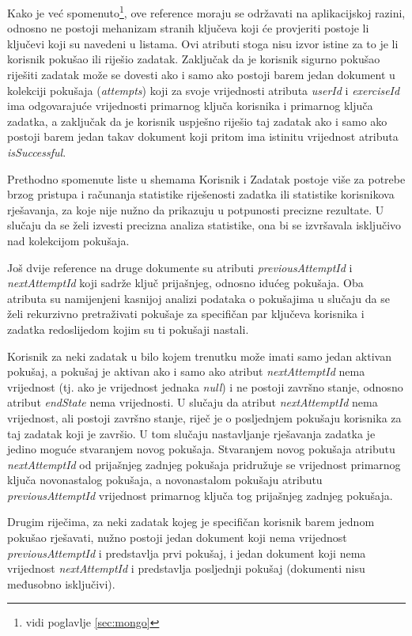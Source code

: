 \documentclass[times, utf8, diplomski, numeric]{fer}
\newcommand{\razmakp}{\vspace{18pt}}
\begin{document}
Kako je već spomenuto\footnote{vidi poglavlje \ref{sec:mongo}}, ove reference moraju se održavati na aplikacijskoj razini, odnosno ne postoji mehanizam stranih ključeva koji će provjeriti postoje li ključevi koji su navedeni u listama.
Ovi atributi stoga nisu izvor istine  za to je li korisnik pokušao ili riješio zadatak.
Zaključak da je korisnik sigurno pokušao riješiti zadatak može se dovesti ako i samo ako postoji barem jedan dokument u kolekciji pokušaja (\emph{attempts}) koji za svoje vrijednosti atributa \emph{userId} i \emph{exerciseId} ima odgovarajuće vrijednosti primarnog ključa korisnika i primarnog ključa zadatka, a zaključak da je korisnik uspješno riješio taj zadatak ako i samo ako postoji barem jedan takav dokument koji pritom ima istinitu vrijednost atributa \emph{isSuccessful}.

Prethodno spomenute liste u shemama Korisnik i Zadatak postoje više za potrebe brzog pristupa i računanja statistike riješenosti zadatka ili statistike korisnikova rješavanja, za koje nije nužno da prikazuju u potpunosti precizne rezultate.
U slučaju da se želi izvesti precizna analiza statistike, ona bi se izvršavala isključivo nad kolekcijom pokušaja.

\razmakp

Još dvije reference na druge dokumente su atributi \emph{previousAttemptId} i \emph{nextAttemptId} koji sadrže ključ prijašnjeg, odnosno idućeg pokušaja.
Oba atributa su namijenjeni kasnijoj analizi podataka o pokušajima u slučaju da se želi rekurzivno pretraživati pokušaje za specifičan par ključeva korisnika i zadatka redoslijedom kojim su ti pokušaji nastali.

Korisnik za neki zadatak u bilo kojem trenutku može imati samo jedan aktivan pokušaj, a pokušaj je aktivan ako i samo ako atribut \emph{nextAttemptId} nema vrijednost (tj. ako je vrijednost jednaka \emph{null}) i ne postoji završno stanje, odnosno atribut \emph{endState} nema vrijednosti.
U slučaju da atribut \emph{nextAttemptId} nema vrijednost, ali postoji završno stanje, riječ je o posljednjem pokušaju korisnika za taj zadatak koji je završio.
U tom slučaju nastavljanje rješavanja zadatka je jedino moguće stvaranjem novog pokušaja.
Stvaranjem novog pokušaja atributu \emph{nextAttemptId} od prijašnjeg zadnjeg pokušaja pridružuje se vrijednost primarnog ključa novonastalog pokušaja, a novonastalom pokušaju atributu \emph{previousAttemptId} vrijednost primarnog ključa tog prijašnjeg zadnjeg pokušaja.

Drugim riječima, za neki zadatak kojeg je specifičan korisnik barem jednom pokušao rješavati, nužno postoji jedan dokument koji nema vrijednost \emph{previousAttemptId} i predstavlja prvi pokušaj, i jedan dokument koji nema vrijednost \emph{nextAttemptId} i predstavlja posljednji pokušaj (dokumenti nisu međusobno isključivi).
\end{document}
